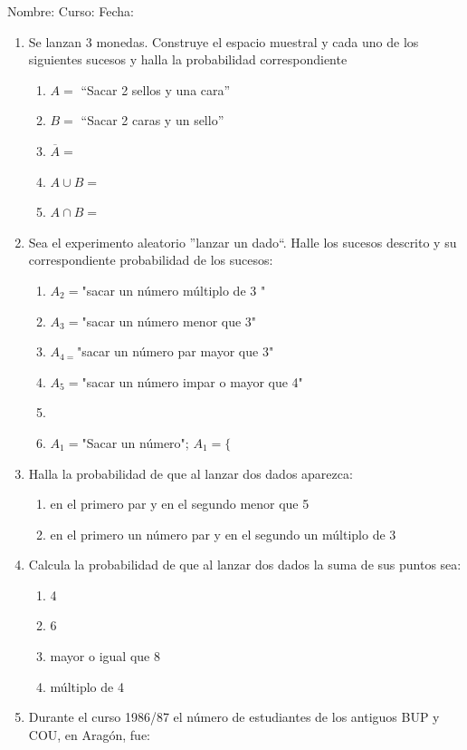 \documentclass[fleqn]{article}
\newcommand{\LineaNombre}{%
\par
\vspace{\baselineskip}
Nombre:\hrulefill \; Curso: \underline{\hspace*{48pt}} \; Fecha: \underline{\hspace*{2.5cm}} \relax
\par}
\begin{document}
\LineaNombre
\begin{enumerate}
 \item Se lanzan 3 monedas. Construye el espacio muestral y cada uno de los siguientes sucesos y halla la probabilidad correspondiente
 \begin{enumerate}

 \item $A=$ ``Sacar 2 sellos y una cara'' \noanswer
 \item $B=$ ``Sacar 2 caras y un sello'' \noanswer
 \item $\overline{A}=$ \noanswer
 \item $A\cup B=$ \noanswer
 \item $A\cap B=$ \noanswer
 \end{enumerate}
 \item Sea el experimento aleatorio ''lanzar un dado``. Halle los sucesos descrito y su correspondiente probabilidad de los sucesos:
\begin{enumerate}
\item $A_{2}=$"sacar un número múltiplo de 3 " \noanswer
\item $A_{3}=$"sacar un número menor que 3" \noanswer
\item $A_{4=}$"sacar un número par mayor que 3" \noanswer
\item $A_{5}=$"sacar un número impar o mayor que 4"\noanswer
\item \item $A_{1}=$"Sacar un número"; $A_{1}=\{$ \noanswer
\end{enumerate}
  \newpage
\item Halla la probabilidad de que al lanzar dos dados aparezca:
\begin{enumerate}
 \item en el primero par y en el segundo menor que 5 \noanswer
 \item en el primero un número par y en el segundo un múltiplo de 3 \noanswer
\end{enumerate}
\item Calcula la probabilidad de que al lanzar dos dados la suma de sus puntos sea:
\begin{enumerate}
\item 4 \noanswer
\item 6 \noanswer
\item mayor o igual que 8 \noanswer
\item múltiplo de 4 \noanswer
\end{enumerate}
\item Durante el curso 1986/87 el número de estudiantes de los antiguos BUP y COU, en Aragón, fue:


\end{enumerate}
\end{document}
